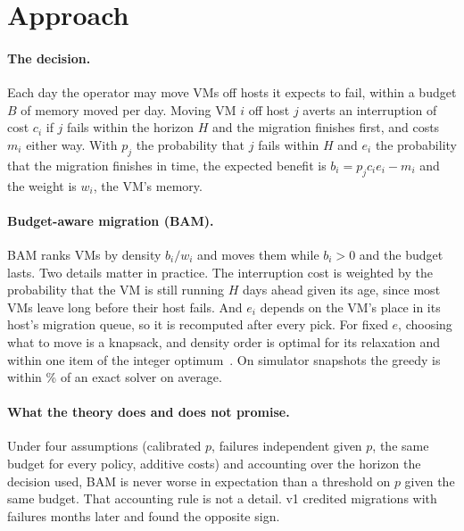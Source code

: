 
\section{Approach}
\label{sec:approach}

\paragraph{The decision.}
Each day the operator may move VMs off hosts it expects to fail, within a budget $B$ of memory
moved per day. Moving VM $i$ off host $j$ averts an interruption of cost $c_i$ if $j$ fails within
the horizon $H$ and the migration finishes first, and costs $m_i$ either way. With $p_j$ the
probability that $j$ fails within $H$ and $e_i$ the probability that the migration finishes in time,
the expected benefit is $b_i = p_j c_i e_i - m_i$ and the weight is $w_i$, the VM's memory.

\paragraph{Budget-aware migration (BAM).}
BAM ranks VMs by density $b_i / w_i$ and moves them while $b_i > 0$ and the budget lasts. Two
details matter in practice. The interruption cost is weighted by the probability that the VM is
still running $H$ days ahead given its age, since most VMs leave long before their host fails. And
$e_i$ depends on the VM's place in its host's migration queue, so it is recomputed after every
pick. For fixed $e$, choosing what to move is a knapsack, and density order is optimal for its
relaxation and within one item of the integer optimum~\cite{dantzig1957discrete}. On simulator
snapshots the greedy is within \VBamExactGap\% of an exact solver on average.

\paragraph{What the theory does and does not promise.}
Under four assumptions (calibrated $p$, failures independent given $p$, the same budget for every
policy, additive costs) and accounting over the horizon the decision used, BAM is never worse in
expectation than a threshold on $p$ given the same budget. That accounting rule is not a detail. v1
credited migrations with failures months later and found the opposite sign.

